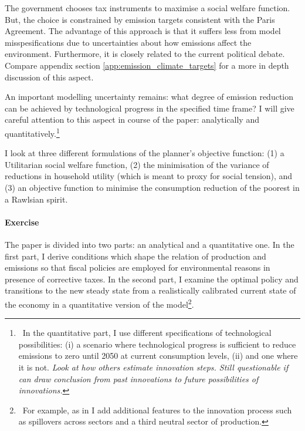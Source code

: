 The government chooses tax instruments to maximise a 
social welfare function. But, the choice is constrained by emission targets consistent with the Paris Agreement. The advantage of this approach is that it suffers less from  model misspesifications due to  uncertainties about how emissions affect the environment. Furthermore, it is closely related to the current political debate. Compare appendix section \ref{app:emission_climate_targets} for a more in depth discussion of this aspect.  


An important modelling uncertainty remains: what degree of emission reduction can be achieved by technological progress in the specified time frame? I will give careful attention to this aspect in course of the paper: analytically and quantitatively.\footnote{\ In the quantitative part, I use different specifications of technological possibilities: (i) a scenario where technological progress is sufficient to reduce emissions to zero until 2050 at current consumption levels, (ii) and one where it is not. \textit{ Look at how others estimate innovation steps. Still questionable if can draw conclusion from past innovations to future possibilities of innovations. }}


I look at three different formulations of the planner's objective function: (1) a Utilitarian social welfare function, (2) the minimisation of the variance of reductions in household utility (which is meant to proxy for social tension), and (3) an objective function to minimise the consumption reduction of the poorest in a Rawlsian spirit. 


\paragraph{Exercise}
The paper is divided into two parts: an analytical and a quantitative one.
In the first part, I derive  conditions which shape the relation of production and emissions so that fiscal policies are employed for environmental reasons in presence  of corrective taxes.  
In the second part, I examine the optimal policy and transitions to the new steady state from a realistically calibrated current state of the economy in a quantitative version of the model\footnote{\ For example, as in  \cite{Fried2018ClimateAnalysis} I add additional features to the innovation process such as spillovers across sectors and a third neutral sector of production.}.

